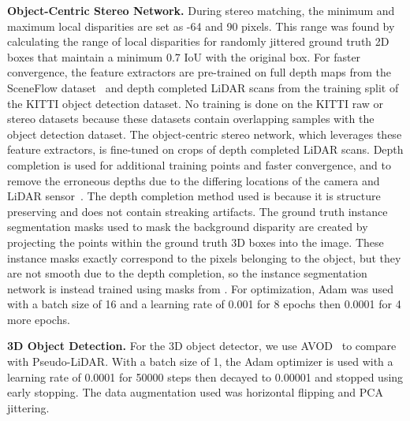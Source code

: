 \documentclass[letterpaper, 10 pt, conference]{ieeeconf}
\begin{document}
\textbf{Object-Centric Stereo Network.} During stereo matching, the minimum and maximum local disparities are set as -64 and 90 pixels. This range was found by calculating the range of local disparities for randomly jittered ground truth 2D boxes that maintain a minimum 0.7 IoU with the original box. For faster convergence, the feature extractors are pre-trained on full depth maps from the SceneFlow dataset~\cite{mayer2016large} and depth completed LiDAR scans from the training split of the KITTI object detection dataset. No training is done on the KITTI raw or stereo datasets because these datasets contain overlapping samples with the object detection dataset. The object-centric stereo network, which leverages these feature extractors, is fine-tuned on crops of depth completed LiDAR scans. Depth completion is used for additional training points and faster convergence, and to remove the erroneous depths due to the differing locations of the camera and LiDAR sensor~\cite{amiri2019semisup}. The depth completion method used is \cite{ku2018defense} because it is structure preserving and does not contain streaking artifacts. The ground truth instance segmentation masks used to mask the background disparity are created by projecting the points within the ground truth 3D boxes into the image. These instance masks exactly correspond to the pixels belonging to the object, but they are not smooth due to the depth completion, so the instance segmentation network is instead trained using masks from \cite{ChenCVPR14}. For optimization, Adam was used with a batch size of 16 and a learning rate of 0.001 for 8 epochs then 0.0001 for 4 more epochs.

\textbf{3D Object Detection.} For the 3D object detector, we use AVOD~\cite{ku_avod} to compare with Pseudo-LiDAR. With a batch size of 1, the Adam optimizer is used with a learning rate of 0.0001 for 50000 steps then decayed to 0.00001 and stopped using early stopping. The data augmentation used was horizontal flipping and PCA jittering.
\end{document}
